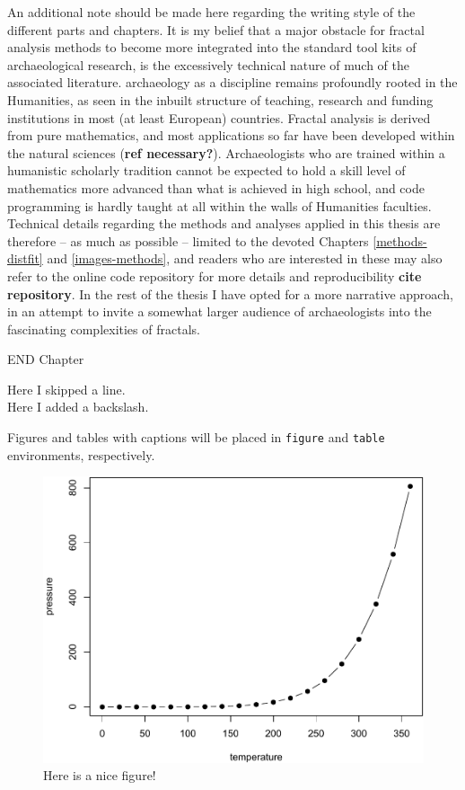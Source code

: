 \documentclass[
  12pt,
]{book}
\begin{document}
An additional note should be made here regarding the writing style of the different parts and chapters. It is my belief that a major obstacle for fractal analysis methods to become more integrated into the standard tool kits of archaeological research, is the excessively technical nature of much of the associated literature. archaeology as a discipline remains profoundly rooted in the Humanities, as seen in the inbuilt structure of teaching, research and funding institutions in most (at least European) countries. Fractal analysis is derived from pure mathematics, and most applications so far have been developed within the natural sciences (\textbf{ref necessary?}). Archaeologists who are trained within a humanistic scholarly tradition cannot be expected to hold a skill level of mathematics more advanced than what is achieved in high school, and code programming is hardly taught at all within the walls of Humanities faculties. Technical details regarding the methods and analyses applied in this thesis are therefore -- as much as possible -- limited to the devoted Chapters \ref{methods-distfit} and \ref{images-methods}, and readers who are interested in these may also refer to the online code repository for more details and reproducibility \textbf{cite repository}. In the rest of the thesis I have opted for a more narrative approach, in an attempt to invite a somewhat larger audience of archaeologists into the fascinating complexities of fractals.

END Chapter

Here I skipped a line.\\
Here I added a backslash.

Figures and tables with captions will be placed in \texttt{figure} and \texttt{table} environments, respectively.

\begin{figure}

{\centering \includegraphics[width=0.8\linewidth]{bookdown-demo_files/figure-latex/nice-fig-1} 

}

\caption{Here is a nice figure!}\label{fig:nice-fig}
\end{figure}
\end{document}
